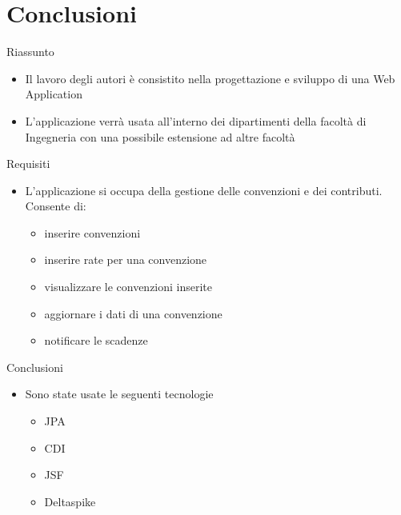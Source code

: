 \section{Conclusioni}
\begin{frame}{Riassunto}
\begin{itemize}
\item Il lavoro degli autori è consistito nella progettazione e sviluppo di una Web Application
\vspace{0.8em}
\item L'applicazione verrà usata all'interno dei dipartimenti della facoltà di Ingegneria con una possibile estensione ad altre facoltà
\end{itemize}

\end{frame}
\begin{frame}{Requisiti}
\begin{itemize}
\item L'applicazione si occupa della gestione delle convenzioni e dei contributi. Consente di:
\vspace{0.8em}
	\begin{itemize}
	\item inserire convenzioni
	\item inserire rate per una convenzione
	\item visualizzare le convenzioni inserite
	\item aggiornare i dati di una convenzione
	\item notificare le scadenze
	\end{itemize}
\end{itemize}
\end{frame}

\begin{frame}{Conclusioni}
\begin{itemize}
\item Sono state usate le seguenti tecnologie
	\begin{itemize}
	\item JPA
	\item CDI
	\item JSF
	\item Deltaspike
\end{itemize}
\end{itemize}
\end{frame}